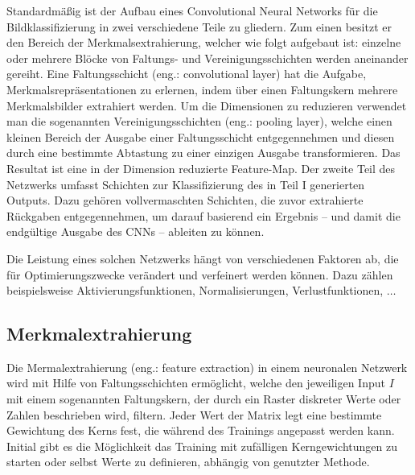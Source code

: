 Standardmäßig ist der Aufbau eines Convolutional Neural Networks für die Bildklassifizierung in zwei verschiedene Teile zu gliedern. Zum einen besitzt er den Bereich der Merkmalsextrahierung, welcher wie folgt aufgebaut ist: einzelne oder mehrere Blöcke von Faltungs- und Vereinigungsschichten werden aneinander gereiht. Eine Faltungsschicht (eng.: convolutional layer) hat die Aufgabe, Merkmalsrepräsentationen zu erlernen, indem über einen Faltungskern mehrere Merkmalsbilder extrahiert werden. Um die Dimensionen zu reduzieren verwendet man die sogenannten Vereinigungsschichten (eng.: pooling layer), welche einen kleinen Bereich der Ausgabe einer Faltungsschicht entgegennehmen und diesen durch eine bestimmte Abtastung zu einer einzigen Ausgabe transformieren. Das Resultat ist eine in der Dimension reduzierte \glqq Feature-Map\grqq{}. Der zweite Teil des Netzwerks umfasst Schichten zur Klassifizierung des in Teil I generierten Outputs. Dazu gehören vollvermaschten Schichten, die zuvor extrahierte Rückgaben entgegennehmen, um darauf basierend ein Ergebnis -- und damit die endgültige Ausgabe des CNNs -- ableiten zu können.

Die Leistung eines solchen Netzwerks hängt von verschiedenen Faktoren ab, die für Optimierungszwecke verändert und verfeinert werden können. Dazu zählen beispielsweise Aktivierungsfunktionen, Normalisierungen, Verlustfunktionen, $\ldots$
\subsection{Merkmalextrahierung}
Die Mermalextrahierung (eng.: feature extraction) in einem neuronalen Netzwerk wird mit Hilfe von Faltungsschichten ermöglicht, welche den jeweiligen Input $I$ mit einem sogenannten Faltungskern, der durch ein Raster diskreter Werte oder Zahlen beschrieben wird, filtern. Jeder Wert der Matrix legt eine bestimmte Gewichtung des Kerns fest, die während des Trainings angepasst werden kann. Initial gibt es die Möglichkeit das Training mit zufälligen Kerngewichtungen zu starten oder selbst Werte zu definieren, abhängig von genutzter Methode.

